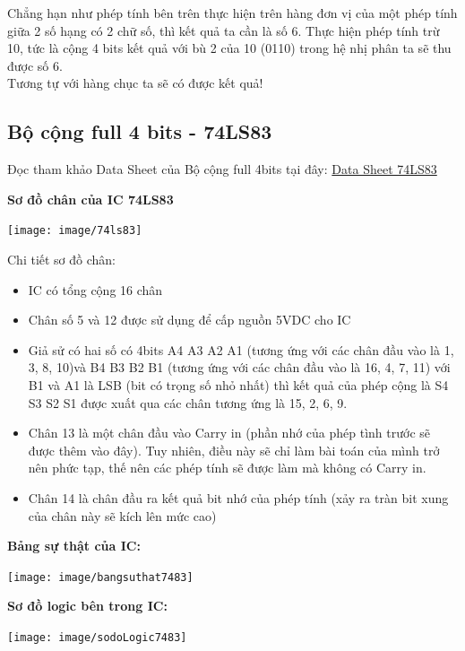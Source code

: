 \documentclass[10pt,a4paper]{report}
\begin{document}
Chẳng hạn như phép tính bên trên thực hiện trên hàng đơn vị của một phép tính giữa 2 số hạng có 2 chữ số, thì kết quả ta cần là số 6. Thực hiện phép tính trừ 10, tức là cộng 4 bits kết quả với bù 2 của 10 (0110) trong hệ nhị phân ta sẽ thu được số 6.\\

Tương tự với hàng chục ta sẽ có được kết quả!

\subsection{Bộ cộng full 4 bits - 74LS83}

Đọc tham khảo Data Sheet của Bộ cộng full 4bits tại đây: \hyperref{https://pdf1.alldatasheet.com/datasheet-pdf/view/51091/FAIRCHILD/74LS83.html}{category}{name}{Data Sheet 74LS83} %

\textbf{Sơ đồ chân của IC 74LS83}
\begin{center}
	\texttt{[image: image/74ls83]}
\end{center}

Chi tiết sơ đồ chân:
\begin{itemize}
	\item IC có tổng cộng 16 chân
	\item Chân số 5 và 12 được sử dụng để cấp nguồn 5VDC cho IC
	\item Giả sử có hai số có 4bits A4 A3 A2 A1 (tương ứng với các chân đầu vào là 1, 3, 8, 10)và B4 B3 B2 B1 (tương ứng với các chân đầu vào là 16, 4, 7, 11) với B1 và A1 là LSB (bit có trọng số nhỏ nhất) thì kết quả của phép cộng là S4 S3 S2 S1 được xuất qua các chân tương ứng là 15, 2, 6, 9.
	\item Chân 13 là một chân đầu vào Carry in (phần nhớ của phép tình trước sẽ được thêm vào đây). Tuy nhiên, điều này sẽ chỉ làm bài toán của mình trở nên phức tạp, thế nên các phép tính sẽ được làm mà không có Carry in.
	\item Chân 14 là chân đầu ra kết quả bit nhớ của phép tính (xảy ra tràn bit xung của chân này sẽ kích lên mức cao)
\end{itemize}

\textbf{Bảng sự thật của IC:}

\begin{center}
		\texttt{[image: image/bangsuthat7483]}

\end{center}

\textbf{Sơ đồ logic bên trong IC:}
\begin{center}
	\texttt{[image: image/sodoLogic7483]}
\end{center}
\end{document}
